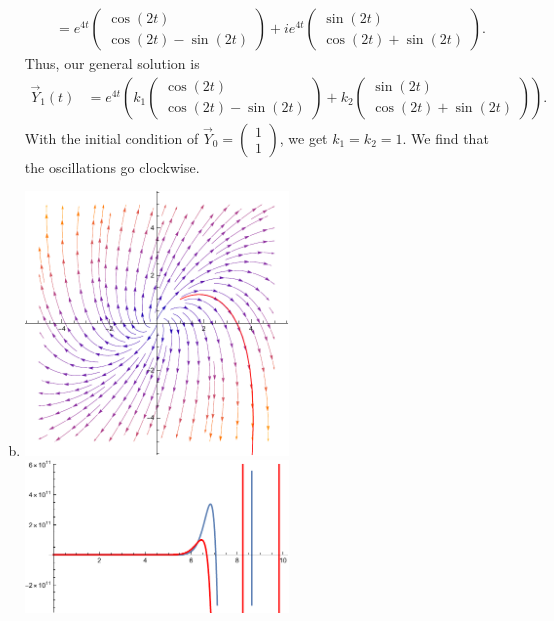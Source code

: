 \documentclass[10pt]{mypackage}
\begin{document}
\begin{enumerate}[(a)]
\begin{align*}
                 &= e^{4t} \begin{pmatrix}\cos\left(2t\right)\\ \cos\left(2t\right) - \sin\left(2t\right)\end{pmatrix} + ie^{4t} \begin{pmatrix}\sin\left(2t\right) \\ \cos\left(2t\right) + \sin\left(2t\right)\end{pmatrix}.
    \end{align*}
    Thus, our general solution is
    \begin{align*}
      \vec{Y}_1(t) &= e^{4t} \left(k_1\begin{pmatrix}\cos\left(2t\right) \\ \cos\left(2t\right) - \sin\left(2t\right)\end{pmatrix} + k_2 \begin{pmatrix}\sin\left(2t\right) \\ \cos\left(2t\right) + \sin\left(2t\right)\end{pmatrix}\right).
      \end{align*}
      With the initial condition of $\vec{Y}_0 = \begin{pmatrix}1\\1\end{pmatrix}$, we get $k_1 = k_2 = 1$. We find that the oscillations go clockwise.
    \item \hfill
      \begin{center}
        \includegraphics[width=7cm]{images/3_4_4e1.pdf} \includegraphics[width=7cm]{images/3_4_4e2.pdf}
      \end{center}
\end{enumerate}
\end{document}
